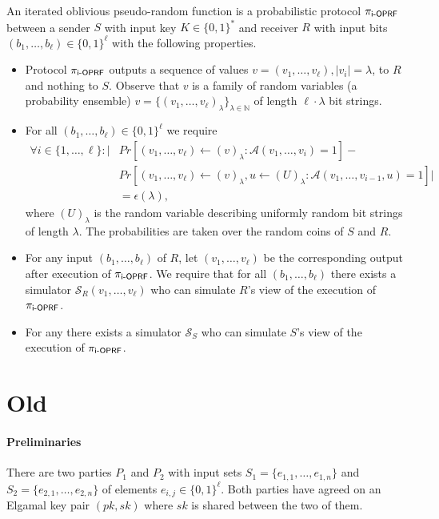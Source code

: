 \documentclass{article}
\newcommand{\dash}[0]{{\text -}}
\newcommand{\A}[0]{{\mathcal{A}}}
\newcommand{\ioprf}[0]{\mathsf{i}\dash\mathsf{OPRF}}
\newcommand{\proto}[0]{{\pi_{\ioprf}}}
\newcommand{\myS}[0]{{\mathcal{S}}}
\newcommand{\N}[0]{{\mathbb{N}}}
\begin{document}
An iterated oblivious pseudo-random function is a probabilistic protocol
$\proto$ between a sender $S$ with input key $K\in\{0,1\}^*$ and receiver $R$
with input bits $(b_1,\ldots,b_\ell)\in\{0,1\}^{\ell}$ with the following properties.

\begin{itemize}
\item Protocol $\proto$ outputs a sequence of values
  $v=(v_1,\ldots,v_\ell),|v_i|=\lambda$, to $R$ and nothing to $S$.
  Observe that $v$ is a family of random variables (a probability
  ensemble) $v=\{(v_1,\ldots,v_\ell)_{\lambda}\}_{\lambda\in\N}$ of length
  $\ell\cdot\lambda$ bit strings.
  
\item 
For all $(b_1,\ldots,b_\ell)\in\{0,1\}^\ell$ we require
\begin{align*}\forall{}i\in\{1,\ldots,\ell\}:|&Pr[(v_1,\ldots,v_\ell)\leftarrow{}(v)_\lambda:\A(v_1,\ldots,v_i)=1]-\\&Pr[(v_1,\ldots,v_\ell)\leftarrow{}(v)_\lambda,u\leftarrow{}(U)_\lambda:\A(v_1,\ldots,v_{i-1},u)=1]|\\&=\epsilon(\lambda),
  \end{align*}
  where $(U)_\lambda$ is the random variable describing uniformly random
  bit strings of length $\lambda$. The probabilities are taken over
  the random coins of $S$ and $R$.

\item For any input $(b_1,\ldots,b_\ell)$ of $R$, let
  $(v_1,\ldots,v_\ell)$ be the corresponding output after execution of
  $\proto$. We require that for all $(b_1,\ldots,b_\ell)$ there
  exists a simulator $\myS_R(v_1,\ldots,v_\ell)$ who can
  simulate $R$'s view of the execution of $\proto$.

\item For any there
  exists a simulator $\myS_S$ who can
  simulate $S$'s view of the execution of $\proto$.
  
\end{itemize}

\section{Old}
\paragraph{Preliminaries} There are two parties $P_1$ and $P_2$ with
input sets $S_1=\{e_{1,1},\ldots,e_{1,n}\}$ and
$S_2=\{e_{2,1},\ldots,e_{2,n}\}$ of elements
$e_{i,j}\in\{0,1\}^\ell$. Both parties have agreed on an Elgamal key
pair $(pk,sk)$ where $sk$ is shared between the two of them.
\end{document}
